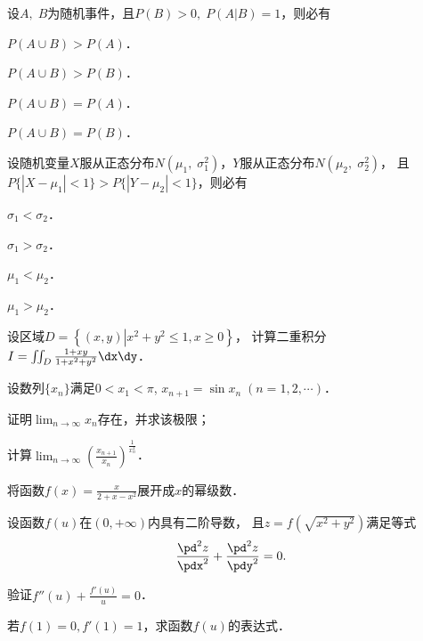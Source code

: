 \documentclass[plain,noanswer,medmath]{../../template/jnuexam}
\begin{document}
\begin{problem}
设$A,\;B$为随机事件，且$P(B) > 0,\;P(A|B) = 1$，则必有\pickout{}
\begin{abcd}
\item $P(A \cup B) > P(A)$．
\item $P(A \cup B) > P(B)$．
\item $P(A \cup B) = P(A)$．
\item $P(A \cup B) = P(B)$．
\end{abcd}
\end{problem}


\begin{problem}
设随机变量$X$服从正态分布$N(\mu_1,\;\sigma_1^2)$，$Y$服从正态分布$N(\mu_2,\;\sigma_2^2)$，
且\goodbreak$P\{|X - \mu_1| < 1\} > P\{|Y - \mu_2| < 1\}$，则必有\pickout{}
\begin{abcd}
\item $\sigma_1 < \sigma_2$．
\item $\sigma_1 > \sigma_2$．
\item $\mu_1 < \mu_2$．
\item $\mu_1 > \mu_2$．
\end{abcd}
\end{problem}




\begin{problem}[points=10]
设区域$D = \left\{\left(x,y \right)\left| x^2 + y^2 \le 1,x \ge 0 \right. \right\}$，
计算二重积分$I = \iint_D \frac{1 + xy}{1 + x^2 + y^2}\dx\dy$．
\end{problem}


\begin{problem}[points=12]
设数列$\{x_n\}$满足$0<x_1<\pi$, $x_{n+1} = \sin x_n\;(n = 1,2, \cdots)$．\par
\begin{enumerate*}
\item 证明$\lim_{n \to \infty} x_n$存在，并求该极限；
\item 计算$\lim_{n \to \infty} \left(\frac{x_{n + 1}}{x_n}\right)^{\frac{1}{x_n^2}}$．
\end{enumerate*}
\end{problem}


\begin{problem}[points=12]
将函数$f(x) = \frac{x}{2 + x - x^2}$展开成$x$的幂级数．
\end{problem}


\begin{problem}[points=12]
设函数$f(u)$在$(0,+\infty)$内具有二阶导数，
且$z = f\left(\sqrt{x^2 + y^2}\right)$满足等式
$$\frac{\pd^2z}{\pdx^2} + \frac{\pd^2z}{\pdy^2}=0.$$
\begin{enumerate*}
\item 验证$f''(u) + \frac{f'(u)}{u} = 0$．
\item 若$f(1) = 0,f'(1) = 1$，求函数$f(u)$的表达式．
\end{enumerate*}
\end{problem}
\end{document}
